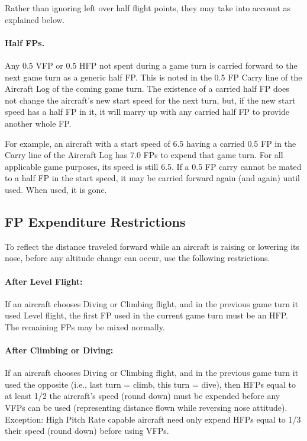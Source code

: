 
Rather than ignoring left over half flight points, they may take into account as explained below.

\paragraph{Half FPs.} Any 0.5 VFP or 0.5 HFP not spent during a game turn is carried forward to the next game turn as a generic half FP. This is noted in the 0.5 FP Carry line of the Aircraft Log of the coming game turn. The existence of a carried half FP does not change the aircraft's new start speed for the next turn, but, if the new start speed has a half FP in it, it will marry up with any carried half FP to provide another whole FP.

For example, an aircraft with a start speed of 6.5 having a carried 0.5 FP in the Carry line of the Aircraft Log has 7.0 FPs to expend that game turn. For all applicable game purposes, its speed is still 6.5. If a 0.5 FP carry cannot be mated to a half FP in the start speed, it may be carried forward again (and again) until used. When used, it is gone.

\subsection{FP Expenditure Restrictions}

To reflect the distance traveled forward while an aircraft is raising or lowering its nose, before any altitude change can occur, use the following restrictions.

\paragraph{After Level Flight:} If an aircraft chooses Diving or Climbing flight, and in the previous game turn it used Level flight, the first FP used in the current game turn must be an HFP. The remaining FPs may be mixed normally.

\paragraph{After Climbing or Diving:} If an aircraft chooses Diving or Climbing flight, and in the previous game turn it used the opposite (i.e., last turn = climb, this turn = dive), then HFPs equal to at least 1/2 the aircraft's speed (round down) must be expended before any VFPs can be used (representing distance flown while reversing nose attitude). Exception: High Pitch Rate capable aircraft need only expend HFPs equal to 1/3 their speed (round down) before using VFPs.

